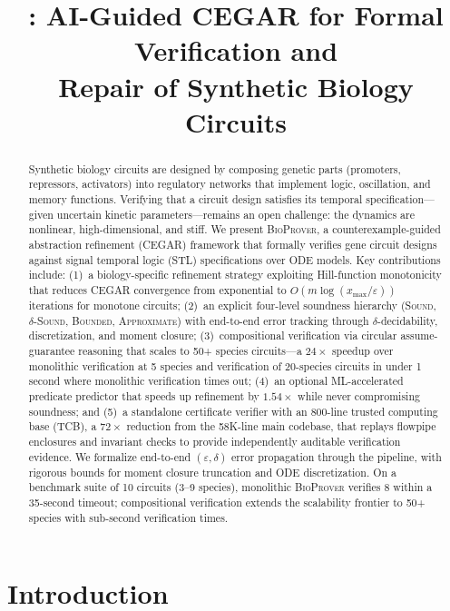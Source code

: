 \documentclass[11pt]{article}
\title{\bioprover{}: AI-Guided CEGAR for Formal Verification and\\
Repair of Synthetic Biology Circuits}
\date{}
\newcommand{\bioprover}{\textsc{BioProver}}
\newcommand{\cegar}{\textsc{CEGAR}}
\newcommand{\stl}{\textsc{STL}}
\begin{document}
\maketitle

\begin{abstract}
Synthetic biology circuits are designed by composing genetic parts
(promoters, repressors, activators) into regulatory networks that
implement logic, oscillation, and memory functions. Verifying that a
circuit design satisfies its temporal specification---given uncertain
kinetic parameters---remains an open challenge: the dynamics are
nonlinear, high-dimensional, and stiff. We present \bioprover{}, a
counterexample-guided abstraction refinement (\cegar{}) framework
that formally verifies gene circuit designs against
signal temporal logic (\stl{}) specifications over ODE models. Key
contributions include: (1)~a biology-specific refinement strategy
exploiting Hill-function monotonicity that reduces \cegar{}
convergence from exponential to $O(m \log(x_{\max}/\varepsilon))$
iterations for monotone circuits; (2)~an explicit four-level
soundness hierarchy (\textsc{Sound}, \textsc{$\delta$-Sound},
\textsc{Bounded}, \textsc{Approximate}) with end-to-end error
tracking through $\delta$-decidability, discretization, and moment
closure; (3)~compositional verification via circular
assume-guarantee reasoning that scales to 50+ species circuits---a
$24\times$ speedup over monolithic verification at 5 species and
verification of 20-species circuits in under 1 second where
monolithic verification times out; (4)~an optional ML-accelerated
predicate predictor that speeds up refinement by $1.54\times$ while
never compromising soundness; and (5)~a standalone certificate
verifier with an 800-line trusted computing base (TCB), a
$72\times$ reduction from the 58K-line main codebase, that replays
flowpipe enclosures and invariant checks to provide independently
auditable verification evidence. We formalize end-to-end
$(\varepsilon,\delta)$ error propagation through the pipeline, with
rigorous bounds for moment closure truncation and ODE
discretization. On a benchmark suite of 10 circuits (3--9 species),
monolithic \bioprover{} verifies 8 within a 35-second timeout;
compositional verification extends the scalability frontier to 50+
species with sub-second verification times.
\end{abstract}

\section{Introduction}
\label{sec:intro}
\end{document}
